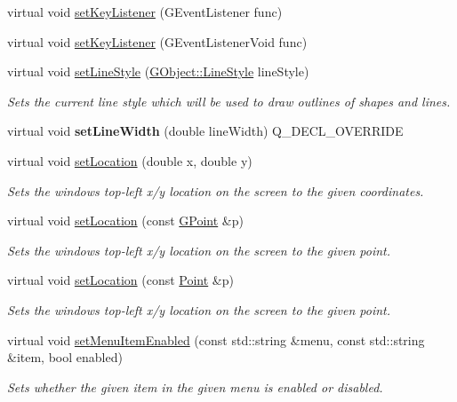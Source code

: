 \begin{DoxyCompactItemize}
virtual void \mbox{\hyperlink{classGWindow_aeb8324d3287fa1fbe093f4d6230cf0a6}{set\+Key\+Listener}} (G\+Event\+Listener func)
\item 
virtual void \mbox{\hyperlink{classGWindow_ae48ecea73606c7bd9423e1c7cc589cc9}{set\+Key\+Listener}} (G\+Event\+Listener\+Void func)
\item 
virtual void \mbox{\hyperlink{classGDrawingSurface_a6bfe14a77101db0fb97b5a7e07a5526b}{set\+Line\+Style}} (\mbox{\hyperlink{classGObject_a86e0f5648542856159bb40775c854aa7}{G\+Object\+::\+Line\+Style}} line\+Style)
\begin{DoxyCompactList}\small\item\em Sets the current line style which will be used to draw outlines of shapes and lines. \end{DoxyCompactList}\item 
virtual void {\bfseries set\+Line\+Width} (double line\+Width) Q\+\_\+\+D\+E\+C\+L\+\_\+\+O\+V\+E\+R\+R\+I\+DE
\item 
virtual void \mbox{\hyperlink{classGWindow_a04594e8ba9b98513a64f1da00dcae18c}{set\+Location}} (double x, double y)
\begin{DoxyCompactList}\small\item\em Sets the window\textquotesingle{}s top-\/left x/y location on the screen to the given coordinates. \end{DoxyCompactList}\item 
virtual void \mbox{\hyperlink{classGWindow_a6ef8e1a904fffe55052f7a22f8552e4b}{set\+Location}} (const \mbox{\hyperlink{classGPoint}{G\+Point}} \&p)
\begin{DoxyCompactList}\small\item\em Sets the window\textquotesingle{}s top-\/left x/y location on the screen to the given point. \end{DoxyCompactList}\item 
virtual void \mbox{\hyperlink{classGWindow_a87e01677a5e66337a16b60524e3796ab}{set\+Location}} (const \mbox{\hyperlink{classPoint}{Point}} \&p)
\begin{DoxyCompactList}\small\item\em Sets the window\textquotesingle{}s top-\/left x/y location on the screen to the given point. \end{DoxyCompactList}\item 
virtual void \mbox{\hyperlink{classGWindow_a875124740630bebec069479fd3958efc}{set\+Menu\+Item\+Enabled}} (const std\+::string \&menu, const std\+::string \&item, bool enabled)
\begin{DoxyCompactList}\small\item\em Sets whether the given item in the given menu is enabled or disabled. \end{DoxyCompactList}\item 

\end{DoxyCompactItemize}
